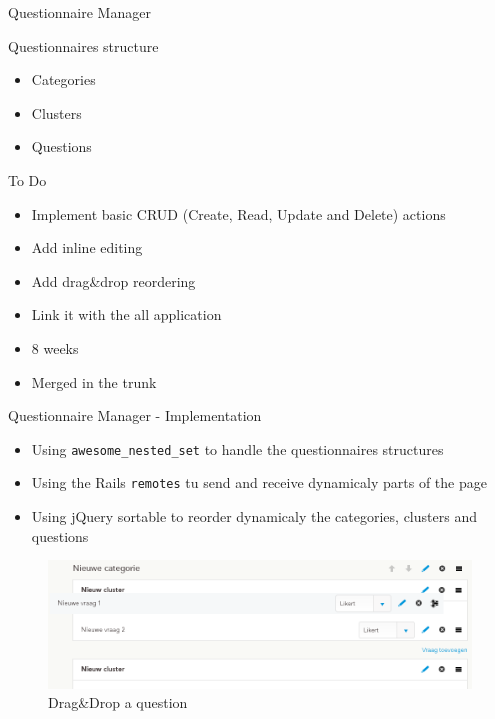 \documentclass[10pt,a4paper]{beamer}
\begin{document}
\begin{frame}{Questionnaire Manager}
  \begin{block}{Questionnaires structure}
    \begin{itemize}
      \item Categories
      \item Clusters
      \item Questions 
    \end{itemize}
  \end{block}

  \begin{block}{To Do}
    \begin{itemize}
      \item Implement basic CRUD (Create, Read, Update and Delete) actions 
      \item Add inline editing
      \item Add drag\&drop reordering 
      \item Link it with the all application
    \end{itemize}
  \end{block}
  
  \begin{block}{}
    \begin{itemize}
      \item 8 weeks
      \item Merged in the trunk
    \end{itemize}
  \end{block}
\end{frame}

\begin{frame}{Questionnaire Manager - Implementation}
  \begin{itemize}
    \item Using \texttt{awesome\_nested\_set} to handle the questionnaires structures
    \item Using the Rails \texttt{remotes} tu send and receive dynamicaly parts of the page
    \item Using jQuery sortable to reorder dynamicaly the categories, clusters and questions
  \end{itemize}
  
  \begin{figure}[htp]
  \centering
  \includegraphics[scale=0.3]{../img/calibris_drag_drop.png}
   \caption{Drag\&Drop a question}
  \end{figure}
\end{frame}
\end{document}
